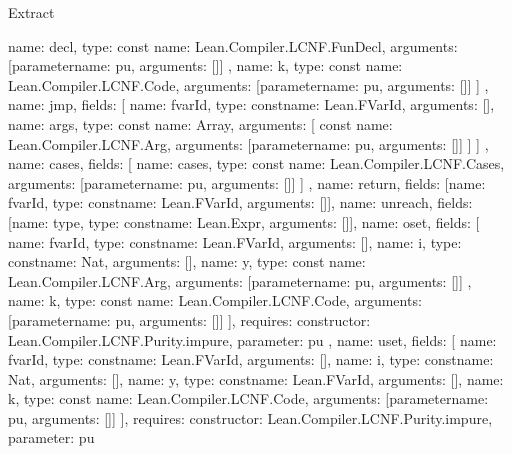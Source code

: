 \begin{lexlean}{Extract}
\begin{toolingmodule}
{{{            {
              name: decl,
              type: const{
                name: Lean.Compiler.LCNF.FunDecl,
                arguments: [parameter{name: pu, arguments: []}]
              }
            },
            {
              name: k,
              type: const{
                name: Lean.Compiler.LCNF.Code,
                arguments: [parameter{name: pu, arguments: []}]
              }
            }
          ]
        },
        {
          name: jmp,
          fields: [
            {name: fvarId, type: const{name: Lean.FVarId, arguments: []}},
            {
              name: args,
              type: const{
                name: Array,
                arguments: [
                  const{
                    name: Lean.Compiler.LCNF.Arg,
                    arguments: [parameter{name: pu, arguments: []}]
                  }
                ]
              }
            }
          ]
        },
        {
          name: cases,
          fields: [
            {
              name: cases,
              type: const{
                name: Lean.Compiler.LCNF.Cases,
                arguments: [parameter{name: pu, arguments: []}]
              }
            }
          ]
        },
        {name: return, fields: [{name: fvarId, type: const{name: Lean.FVarId, arguments: []}}]},
        {name: unreach, fields: [{name: type, type: const{name: Lean.Expr, arguments: []}}]},
        {
          name: oset,
          fields: [
            {name: fvarId, type: const{name: Lean.FVarId, arguments: []}},
            {name: i, type: const{name: Nat, arguments: []}},
            {
              name: y,
              type: const{
                name: Lean.Compiler.LCNF.Arg,
                arguments: [parameter{name: pu, arguments: []}]
              }
            },
            {
              name: k,
              type: const{
                name: Lean.Compiler.LCNF.Code,
                arguments: [parameter{name: pu, arguments: []}]
              }
            }
          ],
          requires: {constructor: Lean.Compiler.LCNF.Purity.impure, parameter: pu}
        },
        {
          name: uset,
          fields: [
            {name: fvarId, type: const{name: Lean.FVarId, arguments: []}},
            {name: i, type: const{name: Nat, arguments: []}},
            {name: y, type: const{name: Lean.FVarId, arguments: []}},
            {
              name: k,
              type: const{
                name: Lean.Compiler.LCNF.Code,
                arguments: [parameter{name: pu, arguments: []}]
              }
            }
          ],
          requires: {constructor: Lean.Compiler.LCNF.Purity.impure, parameter: pu}
}}}
\end{toolingmodule}
\end{lexlean}
